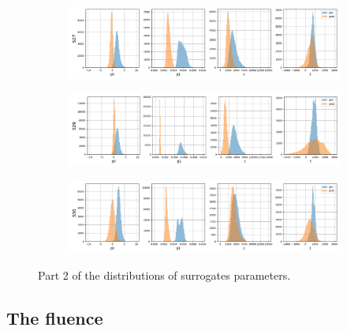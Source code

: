 \begin{figure}[H]
\centering

\begin{subfigure}[b]{0.85\textwidth}
    \centering
    \includegraphics[width=\linewidth]{figures/chapter4/surrogates/p1_S27_histos.png}
  \end{subfigure}

\begin{subfigure}[b]{0.85\textwidth}
    \centering
    \includegraphics[width=\linewidth]{figures/chapter4/surrogates/p1_S29_histos.png}
  \end{subfigure}

\begin{subfigure}[b]{0.85\textwidth}
    \centering
    \includegraphics[width=\linewidth]{figures/chapter4/surrogates/p1_S30_histos.png}
  \end{subfigure}

\label{plot:sensor_surrogate_p2}
  \caption[Surrogate parameters distribution part2]{Part 2 of the distributions of surrogates parameters.}
\end{figure}


\subsection{The fluence}

